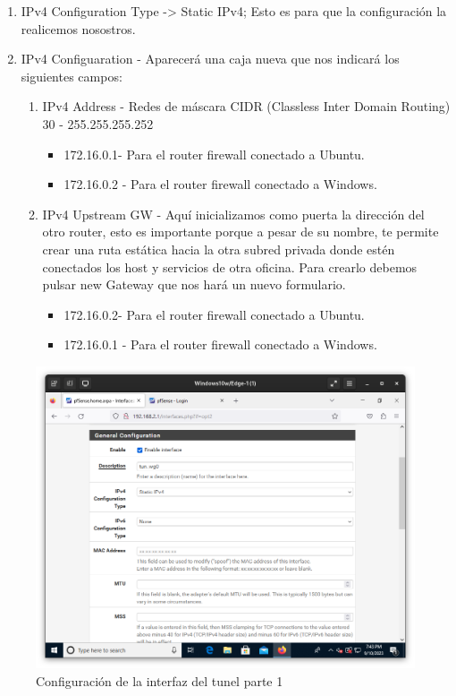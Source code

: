 \begin{enumerate}
    \item IPv4 Configuration Type -> Static IPv4; Esto es para que la configuración la realicemos nosostros.
    \item IPv4 Configuaration - Aparecerá una caja nueva que nos indicará los siguientes campos:
    \begin{enumerate}
        \item IPv4 Address - Redes de máscara CIDR (Classless Inter Domain Routing) 30 - 255.255.255.252
            \begin{itemize}
                \item 172.16.0.1- Para el router firewall conectado a Ubuntu.
                \item 172.16.0.2 - Para el router firewall conectado a Windows.
            \end{itemize}
        \item IPv4 Upstream GW - Aquí inicializamos como puerta la dirección del otro router, esto es importante porque a pesar de su nombre, te permite crear una ruta estática hacia la otra subred privada donde estén conectados los host y servicios de otra oficina. Para crearlo debemos pulsar new Gateway que nos hará un nuevo formulario.
            \begin{itemize}
                \item 172.16.0.2- Para el router firewall conectado a Ubuntu.
                \item 172.16.0.1 - Para el router firewall conectado a Windows.
            \end{itemize}
    \end{enumerate}
\end{enumerate}

\begin{figure}[H]
	\centering
	\includegraphics[scale=0.30]{06}
	\caption{Configuración de la interfaz del tunel parte 1}
\end{figure}

